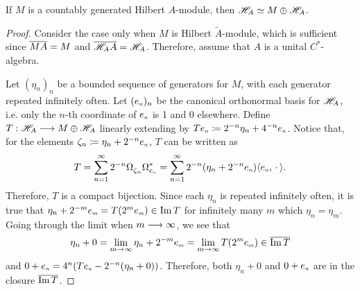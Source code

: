 \begin{teorema}
\label{teo: kasparov stabilization}
If $M$ is a countably generated Hilbert $A$-module, then $\mathscr H_A \simeq M\oplus \mathscr H_A$.
\begin{proof}
Consider the case only when $M$ is Hilbert $\widetilde{A}$-module, which is sufficient since $\overline{MA} = M$ and $\overline{\mathscr H_A A} = \mathscr H_A$. Therefore, assume that $A$ is a unital $C^*$-algebra.

Let $(\eta_n)_n$ be a bounded sequence of generators for $M$, with each generator repeated infinitely often. Let $(\sub e n)_n$ be the canonical orthonormal basis for $\mathscr H_A$, i.e. only the $n$-th coordinate of $\sub e n$ is 1 and 0 elsewhere. Define $T:\mathscr H_A\longrightarrow M\oplus \mathscr H_A$ linearly extending by $T\sub e n \coloneqq 2^{-n} \eta_n + 4^{-n}\sub e n$. Notice that, for the elements $\zeta_n \coloneqq \eta_n+2^{-n}\sub e n$, $T$ can be written as
\begin{equation*}
T = \sum_{n=1}^\infty 2^{-n} \Omega^{\vphantom{*}}_{\zeta_n}\Omega^*_{\sub e n} =  \sum_{n=1}^\infty 2^{-n} (\eta_n+2^{-n}\sub e n)\inner{\sub e n}{\come}.
\end{equation*}
Therefore, $T$ is a compact bijection. Since each $\eta_n$ is repeated infinitely often, it is true that $\eta_n + 2^{-m}\sub e m = T(2^m\sub e m)\in \Im T$ for infinitely many $m$ which $\eta_n=\eta_m$. Going through the limit when $m\longrightarrow \infty$, we see that 
\begin{equation*}
    \eta_n + 0 = \lim_{m\to \infty} \eta_n + 2^{-m}\sub e m = \lim_{m\to \infty} T(2^m\sub e m) \in \con{\Im T}
\end{equation*}
and $0 + \sub e n = 4^n (T\sub e n - 2^{-n}(\eta_n + 0))$. Therefore, both $\eta_n + 0$ and $0+\sub e n$ are in the closure $\overline{\operatorname{Im} T}$.


\end{proof}
\end{teorema}
